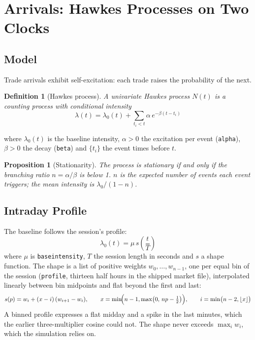 \documentclass[11pt,a4paper]{article}
\newcommand{\key}[1]{\texttt{#1}}
\theoremstyle{paper}
\newtheorem{definition}{Definition}
\newtheorem{proposition}{Proposition}
\begin{document}
\section{Arrivals: Hawkes Processes on Two Clocks}

\subsection{Model}

Trade arrivals exhibit self-excitation: each trade raises the probability of the next.

\begin{definition}[Hawkes process]
A univariate Hawkes process $N(t)$ is a counting process with conditional intensity
\begin{equation}
\lambda(t)=\lambda_0(t)+\sum_{t_i<t}\alpha\,e^{-\beta(t-t_i)}
\end{equation}
\end{definition}
\noindent where $\lambda_0(t)$ is the baseline intensity, $\alpha>0$ the excitation per event (\key{alpha}), $\beta>0$ the decay (\key{beta}) and $\{t_i\}$ the event times before $t$.

\begin{proposition}[Stationarity]
The process is stationary if and only if the branching ratio $n=\alpha/\beta$ is below 1. $n$ is the expected number of events each event triggers; the mean intensity is $\lambda_0/(1-n)$.
\end{proposition}

\subsection{Intraday Profile}

The baseline follows the session's profile:
\begin{equation}
\lambda_0(t)=\mu\,s\!\left(\frac{t}{T}\right)
\end{equation}
where $\mu$ is \key{baseintensity}, $T$ the session length in seconds and $s$ a shape function. The shape is a list of positive weights $w_0,\dots,w_{n-1}$, one per equal bin of the session (\key{profile}, thirteen half hours in the shipped market file), interpolated linearly between bin midpoints and flat beyond the first and last:
\begin{equation}
s(p)=w_i+(x-i)\,(w_{i+1}-w_i),\qquad x=\min\!\Bigl(n-1,\max\bigl(0,\,np-\tfrac12\bigr)\Bigr),\qquad i=\min\bigl(n-2,\lfloor x\rfloor\bigr)
\end{equation}
A binned profile expresses a flat midday and a spike in the last minutes, which the earlier three-multiplier cosine could not. The shape never exceeds $\max_i w_i$, which the simulation relies on.
\end{document}

